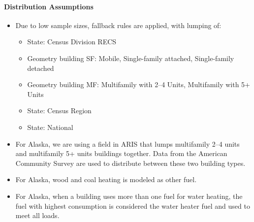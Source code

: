 \paragraph{Distribution Assumptions}
% 
\begin{itemize}
\item
  Due to low sample sizes, fallback rules are applied, with lumping of:
  
  \begin{itemize}
  \item
    State: Census Division RECS
  \item
    Geometry building SF: Mobile, Single-family attached, Single-family detached
  \item
    Geometry building MF: Multifamily with 2--4 Units,
    Multifamily with 5+ Units
  \item
    State: Census Region
\item 
State: National
  \end{itemize}
\item
  For Alaska, we are using a field in ARIS that lumps multifamily 2--4
  units and multifamily 5+ units buildings together. Data from the
  American Community Survey are used to distribute between these two
  building types.
\item
  For Alaska, wood and coal heating is modeled as other fuel.
\item
  For Alaska, when a building uses more than one fuel for water heating,
  the fuel with highest consumption is considered the water heater fuel and used to meet all loads.
\end{itemize}
